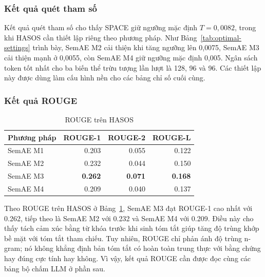 \FloatBarrier

\subsubsection{Kết quả quét tham số}

Kết quả quét tham số cho thấy SPACE giữ ngưỡng mặc định $T=0{,}0082$, trong khi HASOS cần thiết lập riêng theo phương pháp. Như Bảng~\ref{tab:optimal-settings} trình bày, SemAE M2 cải thiện khi tăng ngưỡng lên 0{,}0075, SemAE M3 cải thiện mạnh ở 0{,}0055, còn SemAE M4 giữ ngưỡng mặc định 0{,}005. Ngân sách token tốt nhất cho ba biến thể trừu tượng lần lượt là 128, 96 và 96. Các thiết lập này được dùng làm cấu hình nền cho các bảng chỉ số cuối cùng.

\subsubsection{Kết quả ROUGE}

\begin{table}[tbp]
\centering
\caption{ROUGE trên HASOS}
\label{tab:production-rouge}
\begin{tabular}{l r r r}
\toprule
\textbf{Phương pháp} & \textbf{ROUGE-1} & \textbf{ROUGE-2} & \textbf{ROUGE-L} \\
\midrule
SemAE M1 & \num{0.203} & \num{0.055} & \num{0.122} \\
SemAE M2 & \num{0.232} & \num{0.044} & \num{0.150} \\
SemAE M3 & \textbf{\num{0.262}} & \textbf{\num{0.071}} & \textbf{\num{0.168}} \\
SemAE M4 & \num{0.209} & \num{0.040} & \num{0.137} \\
\bottomrule
\end{tabular}
\end{table}

Theo ROUGE trên HASOS ở Bảng~\ref{tab:production-rouge}, SemAE M3 đạt ROUGE-1 cao nhất với \num{0.262}, tiếp theo là SemAE M2 với \num{0.232} và SemAE M4 với \num{0.209}. Điều này cho thấy tách cảm xúc bằng từ khóa trước khi sinh tóm tắt giúp tăng độ trùng khớp bề mặt với tóm tắt tham chiếu. Tuy nhiên, ROUGE chỉ phản ánh độ trùng n-gram; nó không khẳng định bản tóm tắt có hoàn toàn trung thực với bằng chứng hay đúng cực tính hay không. Vì vậy, kết quả ROUGE cần được đọc cùng các bảng bộ chấm LLM ở phần sau.

